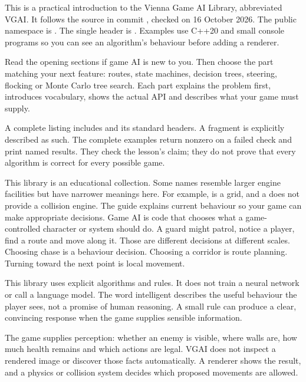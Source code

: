 \documentclass[11pt,a4paper]{article}
\begin{document}
\tableofcontents
{}
This is a practical introduction to the Vienna Game AI Library, abbreviated VGAI. It follows the source in commit , checked on 16 October 2026. The public namespace is . The single header is . Examples use C++20 and small console programs so you can see an algorithm's behaviour before adding a renderer.

Read the opening sections if game AI is new to you. Then choose the part matching your next feature: routes, state machines, decision trees, steering, flocking or Monte Carlo tree search. Each part explains the problem first, introduces vocabulary, shows the actual API and describes what your game must supply.

A complete listing includes  and its standard headers. A fragment is explicitly described as such. The complete examples return nonzero on a failed check and print named results. They check the lesson's claim; they do not prove that every algorithm is correct for every possible game.

This library is an educational collection. Some names resemble larger engine facilities but have narrower meanings here. For example,  is a grid, and a  does not provide a collision engine. The guide explains current behaviour so your game can make appropriate decisions.
Game AI is code that chooses what a game-controlled character or system should do. A guard might patrol, notice a player, find a route and move along it. Those are different decisions at different scales. Choosing chase is a behaviour decision. Choosing a corridor is route planning. Turning toward the next point is local movement.

This library uses explicit algorithms and rules. It does not train a neural network or call a language model. The word intelligent describes the useful behaviour the player sees, not a promise of human reasoning. A small rule can produce a clear, convincing response when the game supplies sensible information.

The game supplies perception: whether an enemy is visible, where walls are, how much health remains and which actions are legal. VGAI does not inspect a rendered image or discover those facts automatically. A renderer shows the result, and a physics or collision system decides which proposed movements are allowed.
\end{document}
